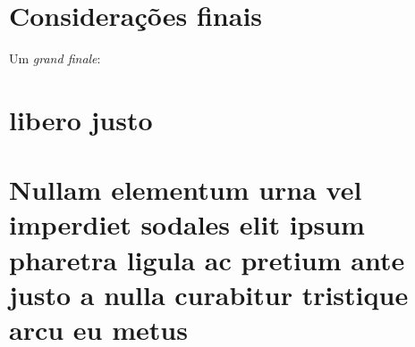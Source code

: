 \documentclass[
	12pt,				%
	openright,			%
	twoside,			%
	a4paper,			%
	english,			%
	brazil				%
	]{abntex2}
\begin{document}
\chapter*{Considerações finais} %

Um \emph{grand finale}: \lipsum[31-33]

\postextual

\printbibliography[title=Referências]

%
%

\begin{apendicesenv}

\partapendices
\chapter{libero justo}
\lipsum[30]

\chapter{Nullam elementum urna vel imperdiet sodales elit ipsum pharetra ligula
	ac pretium ante justo a nulla curabitur tristique arcu eu metus}
\lipsum[55-57]
\end{apendicesenv}
\end{document}
